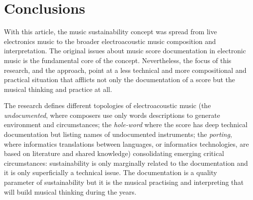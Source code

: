 \documentclass[twoside,a4paper]{article}
\begin{document}
%
%
%
%
%
%
%

\clearpage

\section{Conclusions}

With this article, the music sustainability concept was spread from live
electronics music to the broader electroacoustic music composition and
interpretation. The original issues \cite{bevi05} about music score documentation
in electronic music is the fundamental core of the concept. Nevertheless, the
focus of this research, and the approach, point at a less technical and more
compositional and practical situation that afflicts not only the documentation
of a score but the musical thinking and practice at all.

The research defines different topologies of electroacoustic music (the
\emph{undocumented}, where composers use only words descriptions to generate
environment and circumstances; the \emph{hole-word} where the score has deep
technical documentation but listing names of undocumented instruments; the
\emph{porting}, where informatics translations between languages, or informatics
technologies, are based on literature and shared knowledge) consolidating
emerging critical circumstances: sustainability is only marginally related to the
documentation and it is only superficially a technical issue. The documentation
is a quality parameter of sustainability but it is the musical practising and
interpreting that will build musical thinking during the years.
\end{document}
